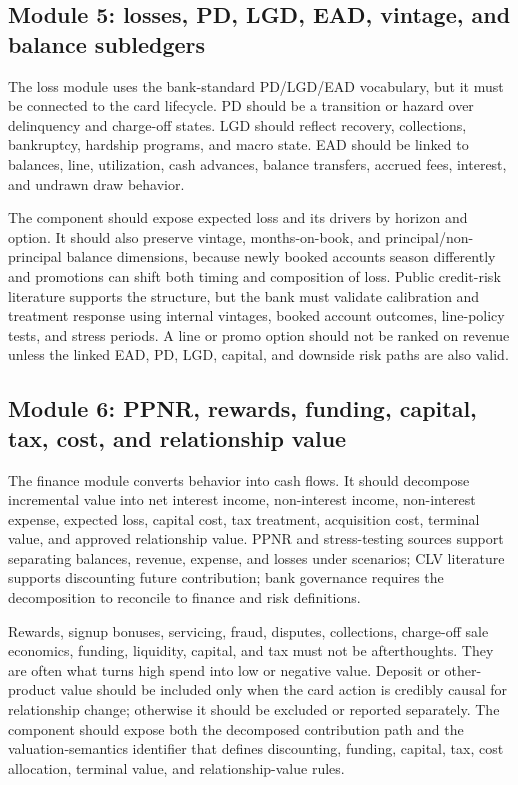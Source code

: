 \documentclass[11pt]{article}
\newcommand{\1}{\mathbf{1}}
\begin{document}
\subsection{Module 5: losses, PD, LGD, EAD, vintage, and balance subledgers}
\label{subsec:module-losses}

The loss module uses the bank-standard PD/LGD/EAD vocabulary, but it must be
connected to the card lifecycle. PD should be a transition or hazard over
delinquency and charge-off states. LGD should reflect recovery, collections,
bankruptcy, hardship programs, and macro state. EAD should be linked to
balances, line, utilization, cash advances, balance transfers, accrued fees,
interest, and undrawn draw behavior.

The component should expose expected loss and its drivers by horizon and
option. It should also preserve vintage, months-on-book, and
principal/non-principal balance dimensions, because newly booked accounts
season differently and promotions can shift both timing and composition of
loss. Public credit-risk literature supports the structure, but the bank must
validate calibration and treatment response using internal vintages, booked
account outcomes, line-policy tests, and stress periods. A line or promo
option should not be ranked on revenue unless the linked EAD, PD, LGD, capital,
and downside risk paths are also valid.

\subsection{Module 6: PPNR, rewards, funding, capital, tax, cost, and relationship value}
\label{subsec:module-ppnr}

The finance module converts behavior into cash flows. It should decompose
incremental value into net interest income, non-interest income, non-interest
expense, expected loss, capital cost, tax treatment, acquisition cost, terminal
value, and approved relationship value. PPNR and stress-testing sources
support separating balances, revenue, expense, and losses under scenarios; CLV
literature supports discounting future contribution; bank governance requires
the decomposition to reconcile to finance and risk definitions.

Rewards, signup bonuses, servicing, fraud, disputes, collections, charge-off
sale economics, funding, liquidity, capital, and tax must not be afterthoughts.
They are often what turns high spend into low or negative value. Deposit or
other-product value should be included only when the card action is credibly
causal for relationship change; otherwise it should be excluded or reported
separately. The component should expose both the decomposed contribution path
and the valuation-semantics identifier that defines discounting, funding,
capital, tax, cost allocation, terminal value, and relationship-value rules.
\end{document}
